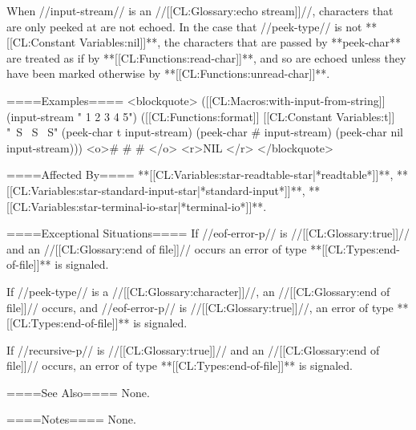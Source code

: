When //input-stream// is an //[[CL:Glossary:echo stream]]//, characters that are only peeked at are not echoed. In the case that //peek-type// is not **[[CL:Constant Variables:nil]]**, the characters that are passed by **peek-char** are treated as if by **[[CL:Functions:read-char]]**, and so are echoed unless they have been marked otherwise by **[[CL:Functions:unread-char]]**.

====Examples==== 
<blockquote> 
([[CL:Macros:with-input-from-string]] (input-stream " 1 2 3 4 5") 
  ([[CL:Functions:format]] [[CL:Constant Variables:t]] "~S ~S ~S" 
          (peek-char t input-stream) 
          (peek-char #\4 input-stream) 
          (peek-char nil input-stream)))
<o>#\1 #\4 #\4 </o>
<r>NIL </r>
</blockquote>

====Affected By====
**[[CL:Variables:star-readtable-star|*readtable*]]**, **[[CL:Variables:star-standard-input-star|*standard-input*]]**, 
**[[CL:Variables:star-terminal-io-star|*terminal-io*]]**.

====Exceptional Situations====
If //eof-error-p// is //[[CL:Glossary:true]]// and an //[[CL:Glossary:end of file]]// occurs an error of type **[[CL:Types:end-of-file]]** is signaled.

If //peek-type// is a //[[CL:Glossary:character]]//, an //[[CL:Glossary:end of file]]// occurs, and //eof-error-p// is //[[CL:Glossary:true]]//, an error of type **[[CL:Types:end-of-file]]** is signaled.

If //recursive-p// is //[[CL:Glossary:true]]// and an //[[CL:Glossary:end of file]]// occurs, an error of type **[[CL:Types:end-of-file]]** is signaled.

====See Also====
None.

====Notes====
None.

 
